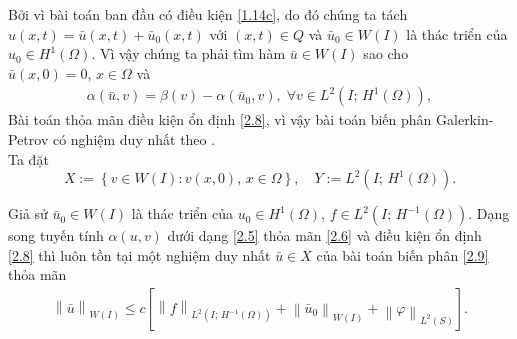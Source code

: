 \documentclass[]{article}
\begin{document}
\noindent Bởi vì bài toán ban đầu có điều kiện \eqref{1.14c}, do đó chúng ta tách $u(x, t)=\bar{u}(x, t)+\bar{u}_0(x, t)$ với $(x, t)\in Q$ và $\bar{u}_0\in W(I)$ là thác triển của $u_0\in H^1(\Omega)$. Vì vậy chúng ta phải tìm hàm $\bar{u}\in W(I)$ sao cho $\bar{u}(x, 0)=0,\, x\in \Omega$ và
\begin{align}\label{2.9}
	\alpha(\bar{u}, v)=\beta(v)-\alpha(\bar{u}_0, v),\; \forall v \in L^2(I;\, H^1(\Omega)),
\end{align}
Bài toán thỏa mãn điều kiện ổn định \eqref{2.8}, vì vậy bài toán biến phân Galerkin-Petrov có nghiệm duy nhất theo \cite[Định lý 3.7, trang 50]{b6}.
\\
Ta đặt
$$X:=\left\{v\in W(I): v(x, 0), \, x\in \Omega \right\},\quad Y:= L^2(I;\, H^1(\Omega)).$$
\begin{hq}
	Giả sử $\bar{u}_0\in W(I)$ là thác triển của $u_0\in H^1(\Omega)$, $f\in L^2(I;\, H^{-1}(\Omega))$. Dạng song tuyến tính $\alpha(u, v)$ dưới dạng \eqref{2.5} thỏa mãn \eqref{2.6} và điều kiện ổn định \eqref{2.8} thì luôn tồn tại một nghiệm duy nhất $\bar{u}\in X$ của bài toán biến phân \eqref{2.9} thỏa mãn \cite[trang 150]{b1}
	\begin{align}\label{2.10}
	\left\|\bar{u} \right\|_{W(I)}\leq c\left[\left\| f\right\|_{L^2(I;\, H^{-1}(\Omega))}+\left\|\bar{u}_0 \right\|_{W(I)}+\left\| \varphi\right\|_{L^2(S)}\right].
	\end{align}
\end{hq}
\end{document}
